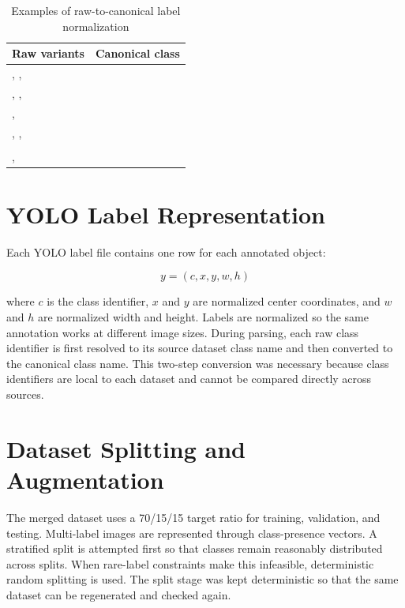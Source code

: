 \begin{table}[H]
\centering
\caption{Examples of raw-to-canonical label normalization}
\label{tab:canonical-examples}
\begin{tabularx}{\textwidth}{L{0.42\textwidth}Y}
\toprule
Raw variants & Canonical class\\
\midrule
{}, ,  & \\
, ,  & \\
,  & \\
, ,  & \\
 & \\
,  & \\
\bottomrule
\end{tabularx}
\end{table}

\section{YOLO Label Representation}

Each YOLO label file contains one row for each annotated object:

\begin{equation}
    y = (c, x, y, w, h)
\end{equation}

where $c$ is the class identifier, $x$ and $y$ are normalized center coordinates, and $w$ and $h$ are normalized width and height. Labels are normalized so the same annotation works at different image sizes. During parsing, each raw class identifier is first resolved to its source dataset class name and then converted to the canonical class name. This two-step conversion was necessary because class identifiers are local to each dataset and cannot be compared directly across sources.

\section{Dataset Splitting and Augmentation}

The merged dataset uses a 70/15/15 target ratio for training, validation, and testing. Multi-label images are represented through class-presence vectors. A stratified split is attempted first so that classes remain reasonably distributed across splits. When rare-label constraints make this infeasible, deterministic random splitting is used. The split stage was kept deterministic so that the same dataset can be regenerated and checked again.

